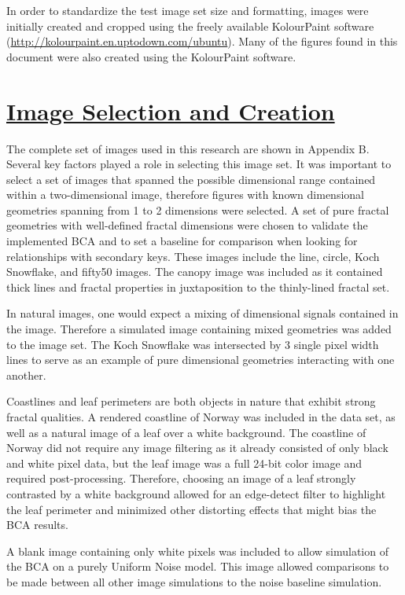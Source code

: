 \documentclass[12pt, oneside]{book}
\begin{document}
In order to standardize the test image set size and formatting, images were initially created and cropped using the freely available KolourPaint software (\url{http://kolourpaint.en.uptodown.com/ubuntu}).  Many of the figures found in this document were also created using the KolourPaint software.


% 
%
\section{\underline{Image Selection and Creation}}
The complete set of images used in this research are shown in Appendix B.  Several key factors played a role in selecting this image set.  It was important to select a set of images that spanned the possible dimensional range contained within a two-dimensional image, therefore figures with known dimensional geometries spanning from 1 to 2 dimensions were selected.  A set of pure fractal geometries with well-defined fractal dimensions were chosen to validate the implemented BCA and to set a baseline for comparison when looking for relationships with secondary keys.  These images include the line, circle, Koch Snowflake, and fifty50 images.  The canopy image was included as it contained thick lines and fractal properties in juxtaposition to the thinly-lined fractal set.

In natural images, one would expect a mixing of dimensional signals contained in the image.  Therefore a simulated image containing mixed geometries was added to the image set.  The Koch Snowflake was intersected by 3 single pixel width lines to serve as an example of pure dimensional geometries interacting with one another.

Coastlines and leaf perimeters are both objects in nature that exhibit strong fractal qualities.  A rendered coastline of Norway was included in the data set, as well as a natural image of a leaf over a white background.  The coastline of Norway did not require any image filtering as it already consisted of only black and white pixel data, but the leaf image was a full 24-bit color image and required post-processing.  Therefore, choosing an image of a leaf strongly contrasted by a white background allowed for an edge-detect filter to highlight the leaf perimeter and minimized other distorting effects that might bias the BCA results.

A blank image containing only white pixels was included to allow simulation of the BCA on a purely Uniform Noise model.  This image allowed comparisons to be made between all other image simulations to the noise baseline simulation.
\end{document}
